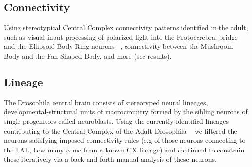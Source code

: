 \documentclass{article}
\begin{document}
 \subsection{Connectivity}
    Using stereotypical Central Complex connectivity patterns identified in the adult, such as visual input processing  of polarized light into the Protocerebral bridge and the Ellipsoid Body Ring neurons ~\citep{hardcastle2021visual, lin2013comprehensive, hulse2021connectome}, connectivity between the Mushroom Body and the Fan-Shaped Body, and more (see results). 

 \subsection{Lineage}
 The Drosophila central brain consists of stereotyped neural lineages, developmental-structural units of macrocircuitry formed by the sibling neurons of single progenitors called neuroblasts. %
 Using the currently identified lineages contributing to the Central Complex of the Adult Drosophila ~\citep{andrade2019developmentally}%
 we filtered the neurons satisfying imposed connectivity rules (e.g of those neurons connecting to the LAL, how many come from a known CX lineage) and continued to constrain these iteratively via a back and forth manual analysis of these neurons. 
\end{document}
